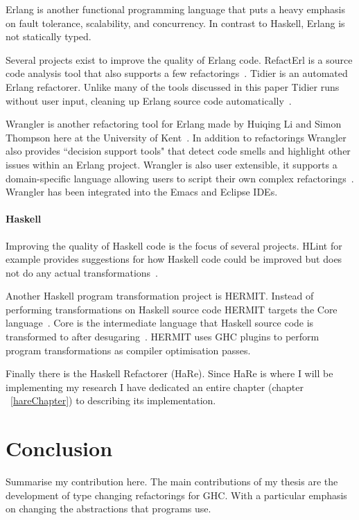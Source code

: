 Erlang is another functional programming language that puts a heavy emphasis on fault tolerance, scalability, and concurrency. In contrast to Haskell, Erlang is not statically typed.
 
Several projects exist to improve the quality of Erlang code. RefactErl is a source code analysis tool that also supports a few refactorings~\citep{refactErlWiki}. Tidier is an automated Erlang refactorer. Unlike many of the tools discussed in this paper Tidier runs without user input, cleaning up Erlang source code automatically~\citep{erlangTidier}.

Wrangler is another refactoring tool for Erlang made by Huiqing Li and Simon Thompson here at the University of Kent~\citep{refacTools}. In addition to refactorings Wrangler also provides ``decision support tools" that detect code smells and highlight other issues within an Erlang project. Wrangler is also user extensible, it supports a domain-specific language allowing users to script their own complex refactorings~\citep{refacTools}. Wrangler has been integrated into the Emacs and Eclipse IDEs.

\subsubsection{Haskell}

Improving the quality of Haskell code is the focus of several projects. HLint for example provides suggestions for how Haskell code could be improved but does not do any actual transformations~\citep{hlint}.

Another Haskell program transformation project is HERMIT. Instead of performing transformations on Haskell source code HERMIT targets the Core language~\citep{hermit}. Core is the intermediate language that Haskell source code is transformed to after desugaring~\citep{ghcDesign}. HERMIT uses GHC plugins to perform program transformations as compiler optimisation passes. 

Finally there is the Haskell Refactorer (HaRe). Since HaRe is where I will be implementing my research I have dedicated an entire chapter (chapter ~\ref{hareChapter}) to describing its implementation. 


\chapter{Conclusion}
Summarise my contribution here. The main contributions of my thesis are the development of type changing refactorings for GHC. With a particular emphasis on changing the abstractions that programs use.



\cleardoublepage
{}
\label{index}
\printindex


